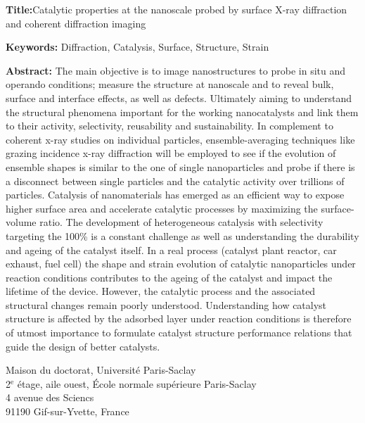 \begin{mdframed}[linecolor=Prune,linewidth=1]

\textbf{Title:}Catalytic properties at the nanoscale probed by surface X-ray diffraction and coherent diffraction imaging

\noindent \textbf{Keywords:} Diffraction, Catalysis, Surface, Structure, Strain

\begin{multicols}{2}
\noindent \textbf{Abstract:} The main objective is to image nanostructures to probe in situ and operando conditions; measure the structure at nanoscale and to reveal bulk, surface and interface effects, as well as defects. Ultimately aiming to understand the structural phenomena important for the working nanocatalysts and link them to their activity, selectivity, reusability and sustainability. In complement to coherent x-ray studies on individual particles, ensemble-averaging techniques like grazing incidence x-ray diffraction will be employed to see if the evolution of ensemble shapes is similar to the one of single nanoparticles and probe if there is a disconnect between single particles and the catalytic activity over trillions of particles. Catalysis of nanomaterials has emerged as an efficient way to expose higher surface area and accelerate catalytic processes by maximizing the surface-volume ratio. The development of heterogeneous catalysis with selectivity targeting the 100\% is a constant challenge as well as understanding the durability and ageing of the catalyst itself. In a real process (catalyst plant reactor, car exhaust, fuel cell) the shape and strain evolution of catalytic nanoparticles under reaction conditions contributes to the ageing of the catalyst and impact the lifetime of the device. However, the catalytic process and the associated structural changes remain poorly understood. Understanding how catalyst structure is affected by the adsorbed layer under reaction conditions is therefore of utmost importance to formulate catalyst structure performance relations that guide the design of better catalysts.
\end{multicols}
\end{mdframed}

\vspace{\fill} %

\noindent
\color{Prune} \footnotesize Maison du doctorat, Université Paris-Saclay\\
2$^{\mathrm{e}}$ étage, aile ouest, École normale supérieure Paris-Saclay\\
4 avenue des Sciencs\\
91190 Gif-sur-Yvette, France